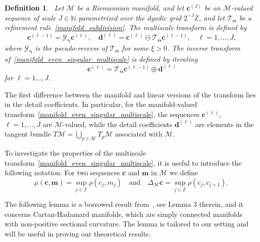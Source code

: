 \documentclass[12pt]{article}
\newtheorem{defin}{Definition}[section]
\begin{document}
\begin{defin}~\label{defin:manifold_even_singular_multiscale}
Let $\mathcal{M}$ be a Riemannian manifold, and let $\boldsymbol{c}^{(J)}$ be an $\mathcal{M}$-valued sequence of scale $J\in\mathbb{N}$ parametrized over the dyadic grid $2^{-J}\mathbb{Z}$, and let $\mathcal{T}_{\boldsymbol{\alpha}}$ be a refinement rule~\eqref{manifold_subdivision}. The multiscale transform is defined by
\begin{equation}~\label{manifold_even_singular_multiscale}
    \boldsymbol{c}^{(\ell-1)} = \mathcal{Y}_{\boldsymbol{\gamma}}\boldsymbol{c}^{(\ell)}, \quad \boldsymbol{d}^{(\ell)} = \boldsymbol{c}^{(\ell)} \ominus \mathcal{T}_{\boldsymbol{\alpha}}\boldsymbol{c}^{(\ell-1)}, \quad \ell=1,\dots,J,
\end{equation}
where $\mathcal{Y}_{\boldsymbol{\gamma}}$ is the pseudo-reverse of $\mathcal{T}_{\boldsymbol{\alpha}}$ for some $\xi>0$. The inverse transform of~\eqref{manifold_even_singular_multiscale} is defined by iterating
\begin{equation}~\label{manifold_synthesis_iterations}
    \boldsymbol{c}^{(\ell)} = \mathcal{T}_{\boldsymbol{\alpha}}\boldsymbol{c}^{(\ell - 1)} \oplus \boldsymbol{d}^{(\ell)}
\end{equation}
for $\ell=1\dots,J$.
\end{defin}

The first difference between the manifold and linear versions of the transform lies in the detail coefficients. In particular, for the manifold-valued transform~\eqref{manifold_even_singular_multiscale}, the sequences $\boldsymbol{c}^{(\ell)}$, $\ell=1,\dots,J$ are $\mathcal{M}$-valued, while the detail coefficients $\boldsymbol{d}^{(\ell)}$ are elements in the tangent bundle $T\mathcal{M}=\bigcup_{p\in\mathcal{M}}T_p\mathcal{M}$ associated with $\mathcal{M}$.

To investigate the properties of the multiscale transform~\eqref{manifold_even_singular_multiscale}, it is useful to introduce the following notation. For two sequences $\boldsymbol{c}$ and $\boldsymbol{m}$ in $\mathcal{M}$ we define
\begin{equation*}
    \mu(\boldsymbol{c}, \boldsymbol{m})=\sup_{j\in\mathbb{Z}}\rho(c_j, m_j) \quad \text{and} \quad \Delta_\mathcal{M}\boldsymbol{c} = \sup_{j\in\mathbb{Z}}\rho(c_{j}, c_{j+1}).
\end{equation*}

The following lemma is a borrowed result from~\cite{wallner2011convergence}, see Lemma 3 therein, and it concerns Cartan-Hadamard manifolds, which are simply connected manifolds with non-positive sectional curvature. The lemma is tailored to our setting and will be useful in proving our theoretical results.
\end{document}
